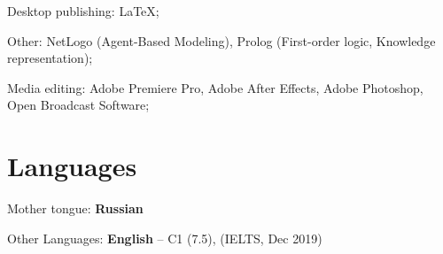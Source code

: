 \documentclass[a4paper, extended]{adcv}
\begin{document}
Desktop publishing: \LaTeX;
  
Other: NetLogo (Agent-Based Modeling), Prolog (First-order logic, Knowledge representation);
  
Media editing: Adobe Premiere Pro, Adobe After Effects, Adobe Photoshop, Open Broadcast Software;
\fi

\section{Languages}

Mother tongue: \textbf{Russian} 

Other Languages: \textbf{English} -- C1 (7.5), (IELTS, Dec 2019)


\end{document}
